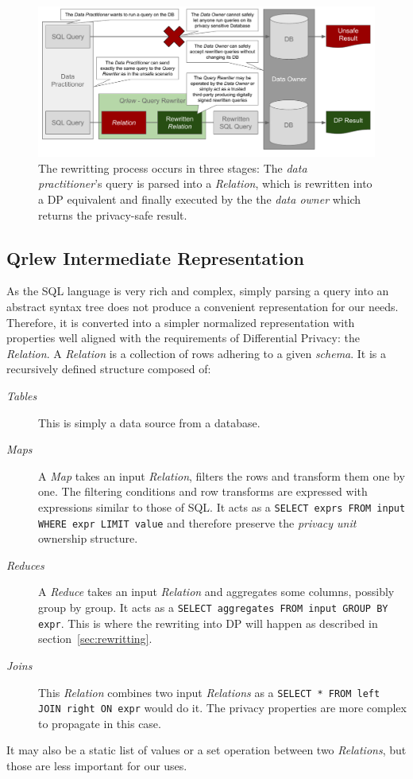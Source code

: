 \documentclass{article}
\begin{document}
    \begin{figure}[t]
        \centering
        \includegraphics[width=\textwidth]{figures/qrlew_process} %
        \caption{The rewritting process occurs in three stages: The \emph{data practitioner}'s query is parsed into a \emph{Relation}, which is rewritten into a DP equivalent and finally executed by the the \emph{data owner} which returns the privacy-safe result.}
        \label{fig:process}
    \end{figure}
    
    \subsection{Qrlew Intermediate Representation}
    \label{sec:intermediate_representation}
    
    As the SQL language is very rich and complex, simply parsing a query into an abstract syntax tree does not produce a convenient representation for our needs. Therefore, it is converted into a simpler normalized representation with properties well aligned with the requirements of Differential Privacy: the \emph{Relation}. A \emph{Relation} is a collection of rows adhering to a given \emph{schema}. It is a recursively defined structure composed of:
    \begin{description}
        \item[\emph{Tables}] This is simply a data source from a database.
        \item[\emph{Maps}] A \emph{Map} takes an input \emph{Relation}, filters the rows and transform them one by one. The filtering conditions and row transforms are expressed with expressions similar to those of SQL. It acts as a \texttt{SELECT exprs FROM input WHERE expr LIMIT value} and therefore preserve the \emph{privacy unit} ownership structure.
        \item[\emph{Reduces}] A \emph{Reduce} takes an input \emph{Relation} and aggregates some columns, possibly group by group. It acts as a \texttt{SELECT aggregates FROM input GROUP BY expr}. This is where the rewriting into DP will happen as described in section~\ref{sec:rewritting}.
        \item[\emph{Joins}] This \emph{Relation} combines two input \emph{Relations} as a \texttt{SELECT * FROM left JOIN right ON expr} would do it. The privacy properties are more complex to propagate in this case.
    \end{description}
    It may also be a static list of values or a set operation between two \emph{Relations}, but those are less important for our uses.
    
\end{document}
